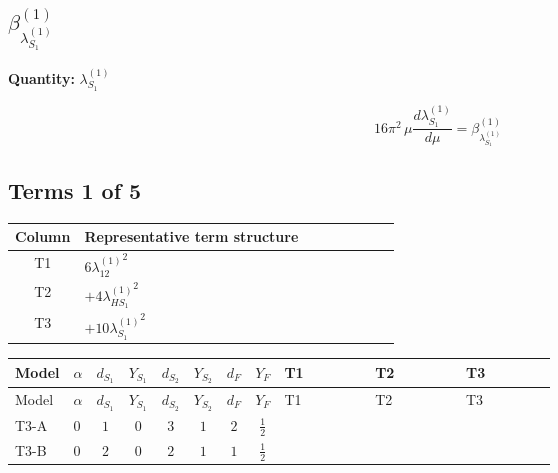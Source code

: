 \documentclass[8pt]{article}
\begin{document}
\begin{landscape}
\section*{$\beta_{\lambda_{S_1}^{(1)}}^{(1)}$}
\noindent\textbf{Quantity: }$\lambda_{S_1}^{(1)}$\par\smallskip
\[16\pi^2\,\mu\frac{d \lambda_{S_1}^{(1)}}{d\mu}=\beta_{\lambda_{S_1}^{(1)}}^{(1)}\]
\subsection*{Terms 1 of 5}
\begin{center}
\begin{tabular}{@{}c >{\raggedright\arraybackslash}p{0.82\linewidth}@{}}
\toprule
Column & Representative term structure \\
\midrule
T1 & \(\displaystyle 6 {\lambda_{12}^{(1)}}^2\) \\
\midrule
T2 & \(\displaystyle +4 {\lambda_{HS_1}^{(1)}}^2\) \\
\midrule
T3 & \(\displaystyle +10 {\lambda_{S_1}^{(1)}}^2\) \\
\midrule
\bottomrule
\end{tabular}
\end{center}
\smallskip
\tiny
\begin{longtable}{@{}llcccccc >{\raggedright\arraybackslash}p{0.21\linewidth} >{\raggedright\arraybackslash}p{0.21\linewidth} >{\raggedright\arraybackslash}p{0.21\linewidth}@{}}
\toprule
Model & $\alpha$ & $d_{S_1}$ & $Y_{S_1}$ & $d_{S_2}$ & $Y_{S_2}$ & $d_F$ & $Y_F$ & T1 & T2 & T3 \\
\midrule
\endfirsthead
\toprule
Model & $\alpha$ & $d_{S_1}$ & $Y_{S_1}$ & $d_{S_2}$ & $Y_{S_2}$ & $d_F$ & $Y_F$ & T1 & T2 & T3 \\
\midrule
\endhead
T3-A & $0$ & $1$ & $0$ & $3$ & $1$ & $2$ & $\frac{1}{2}$ & \scriptsize\adjustbox{max width=\linewidth}{$\begin{gathered} 6 {\lambda_{12}^{(1)}}^2\end{gathered}$} & \scriptsize\adjustbox{max width=\linewidth}{$\begin{gathered} +4 {\lambda_{HS_1}^{(1)}}^2\end{gathered}$} & \scriptsize\adjustbox{max width=\linewidth}{$\begin{gathered} +10 {\lambda_{S_1}^{(1)}}^2\end{gathered}$} \\
\midrule
T3-B & $0$ & $2$ & $0$ & $2$ & $1$ & $1$ & $\frac{1}{2}$ & \scriptsize\adjustbox{max width=\linewidth}{$\begin{gathered} +4 {\lambda_{12}^{(1)}}^2\end{gathered}$} & \scriptsize\adjustbox{max width=\linewidth}{$\begin{gathered} +4 {\lambda_{HS_1}^{(1)}}^2\end{gathered}$} & \scriptsize\adjustbox{max width=\linewidth}{$\begin{gathered} +12 {\lambda_{S_1}^{(1)}}^2\end{gathered}$} \\

\end{longtable}
\end{landscape}
\end{document}
